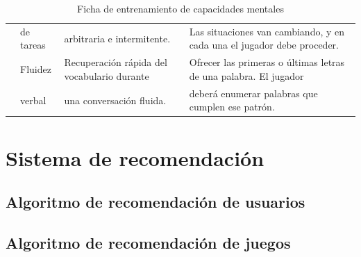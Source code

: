 \begin{table}[H]
\begin{footnotesize}
\begin{center}
\begin{sideways}
\begin{tabular}{|c|l|l|l|}
& de tareas & arbitraria e intermitente. & Las situaciones van cambiando, y en cada una el jugador debe proceder. \\
\cline{2-4}
& Fluidez  & Recuperación rápida del vocabulario durante & Ofrecer las primeras o últimas letras de una palabra. El jugador \\
& verbal & una conversación fluida. & deberá enumerar palabras que cumplen ese patrón. \\
\hline
\end{tabular}
\end{sideways}
\end{center}
\end{footnotesize}
\caption{Ficha de entrenamiento de capacidades mentales}
\end{table}



\section{Sistema de recomendación}


\subsection{Algoritmo de recomendación de usuarios}

\subsection{Algoritmo de recomendación de juegos}





